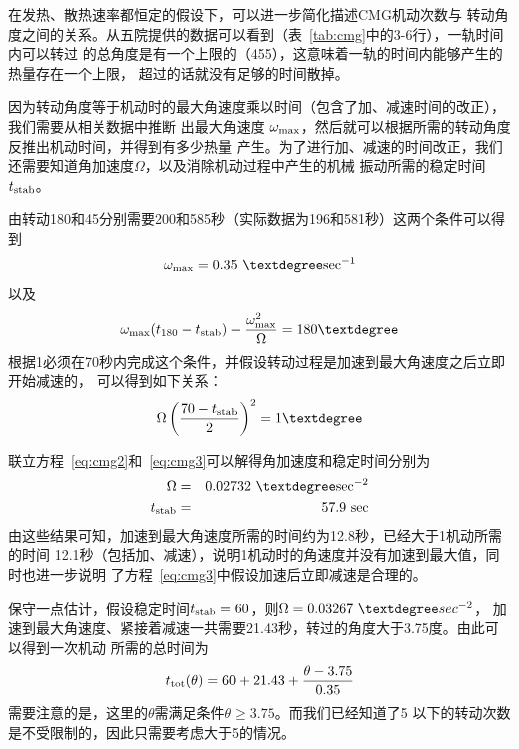 \documentclass[a4paper,11pt]{ctexart}
\begin{document}
在发热、散热速率都恒定的假设下，可以进一步简化描述CMG机动次数与
转动角度之间的关系。从五院提供的数据可以看到（表~\ref{tab:cmg}中的3-6行），一轨时间内可以转过
的总角度是有一个上限的（455\textdegree），这意味着一轨的时间内能够产生的热量存在一个上限，
超过的话就没有足够的时间散掉。

因为转动角度等于机动时的最大角速度乘以时间（包含了加、减速时间的改正），我们需要从相关数据中推断
出最大角速度 $\omega_{\rm max}$，然后就可以根据所需的转动角度反推出机动时间，并得到有多少热量
产生。为了进行加、减速的时间改正，我们还需要知道角加速度$\Omega$，以及消除机动过程中产生的机械
振动所需的稳定时间$t_{\rm stab}$。

由转动180\textdegree 和45\textdegree 分别需要200和585秒（实际数据为196和581秒）这两个条件可以得到
\begin{eqnarray}
\omega_{\rm max} = 0.35 ~ {\textdegree \rm sec^{-1}}
\label{eq:cmg1}
\end{eqnarray}
以及
\begin{eqnarray}
\omega_{\rm max}(t_{180}-t_{\rm stab}) - \frac{\omega^2_{\rm max}}{\Omega} = 180\textdegree
\label{eq:cmg2}
\end{eqnarray}
根据1\textdegree 必须在70秒内完成这个条件，并假设转动过程是加速到最大角速度之后立即开始减速的，
可以得到如下关系：
\begin{eqnarray}
\Omega \left( \frac{70-t_{\rm stab}}{2} \right)^2 = 1 \textdegree
\label{eq:cmg3}
\end{eqnarray}

联立方程~\eqref{eq:cmg2}和~\eqref{eq:cmg3}可以解得角加速度和稳定时间分别为
\begin{eqnarray}
\Omega &=& 0.02732 ~ {\textdegree  \rm sec^{-2}} \\
t_{\rm stab} &=& 57.9 ~ {\rm sec}
\label{eq:cmg4}
\end{eqnarray}
由这些结果可知，加速到最大角速度所需的时间约为12.8秒，已经大于1\textdegree 机动所需的时间
12.1秒（包括加、减速），说明1\textdegree 机动时的角速度并没有加速到最大值，同时也进一步说明
了方程~\eqref{eq:cmg3}中假设加速后立即减速是合理的。

保守一点估计，假设稳定时间$t_{\rm stab}=60$，则$\Omega=0.03267~\textdegree sec^{-2}$，
加速到最大角速度、紧接着减速一共需要21.43秒，转过的角度大于3.75度。由此可以得到一次机动
所需的总时间为
\begin{eqnarray}
t_{\rm tot}(\theta) = 60+21.43+\frac{\theta-3.75}{0.35}
\label{eq:cmg5}
\end{eqnarray}
需要注意的是，这里的$\theta$需满足条件$\theta \ge 3.75$\textdegree 。而我们已经知道了5\textdegree
以下的转动次数是不受限制的，因此只需要考虑大于5\textdegree 的情况。
\end{document}
